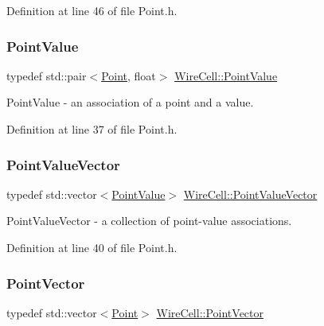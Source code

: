 Definition at line 46 of file Point.\+h.

\mbox{\label{namespace_wire_cell_abc1e159db6ef5d9b40f5aab6bd93352f}} 
\subsubsection{\texorpdfstring{Point\+Value}{PointValue}}
{\footnotesize\ttfamily typedef std\+::pair$<$\hyperlink{namespace_wire_cell_ab2b2565fa6432efbb4513c14c988cda9}{Point}, float$>$ \hyperlink{namespace_wire_cell_abc1e159db6ef5d9b40f5aab6bd93352f}{Wire\+Cell\+::\+Point\+Value}}



Point\+Value -\/ an association of a point and a value. 



Definition at line 37 of file Point.\+h.

\mbox{\label{namespace_wire_cell_a9cdf8eab5ec63490f0328e5ab18219de}} 
\subsubsection{\texorpdfstring{Point\+Value\+Vector}{PointValueVector}}
{\footnotesize\ttfamily typedef std\+::vector$<$\hyperlink{namespace_wire_cell_abc1e159db6ef5d9b40f5aab6bd93352f}{Point\+Value}$>$ \hyperlink{namespace_wire_cell_a9cdf8eab5ec63490f0328e5ab18219de}{Wire\+Cell\+::\+Point\+Value\+Vector}}



Point\+Value\+Vector -\/ a collection of point-\/value associations. 



Definition at line 40 of file Point.\+h.

\mbox{\label{namespace_wire_cell_a702d686b1b45c19eed6654d1d5ef8c7b}} 
\subsubsection{\texorpdfstring{Point\+Vector}{PointVector}}
{\footnotesize\ttfamily typedef std\+::vector$<$\hyperlink{namespace_wire_cell_ab2b2565fa6432efbb4513c14c988cda9}{Point}$>$ \hyperlink{namespace_wire_cell_a702d686b1b45c19eed6654d1d5ef8c7b}{Wire\+Cell\+::\+Point\+Vector}}



